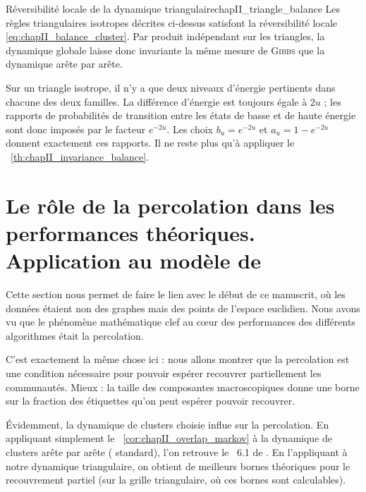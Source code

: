 \begin{Fait}{Réversibilité locale de la dynamique triangulaire}{chapII_triangle_balance}
Les règles triangulaires isotropes décrites ci-dessus satisfont la réversibilité locale \eqref{eq:chapII_balance_cluster}. Par produit indépendant sur les triangles, la dynamique globale laisse donc invariante la même mesure de \textsc{Gibbs} que la dynamique arête par arête.
\end{Fait}

\begin{Preuve}
Sur un triangle isotrope, il n'y a que deux niveaux d'énergie pertinents dans chacune des deux familles. La différence d'énergie est toujours égale à $2u$ ; les rapports de probabilités de transition entre les états de basse et de haute énergie sont donc imposés par le facteur $e^{-2u}$. Les choix $b_u=e^{-2u}$ et $a_u=1-e^{-2u}$ donnent exactement ces rapports. Il ne reste plus qu'à appliquer le \Th~\ref{th:chapII_invariance_balance}.
\end{Preuve}




\section{Le rôle de la percolation dans les performances théoriques. Application au modèle de \SB{}}

\label{sec:chapII_partie_applications}

Cette section nous permet de faire le lien avec le début de ce manuscrit, où les données étaient non des graphes mais des points de l'espace euclidien.
Nous avons vu que le phénomène mathématique clef au cœur des performances des différents algorithmes était la percolation.

C'est exactement la même chose ici : nous allons montrer que la percolation est une condition nécessaire pour pouvoir espérer recouvrer partiellement les communautés.
Mieux : la taille des composantes macroscopiques donne une borne sur la fraction des étiquettes qu'on peut espérer pouvoir recouvrer.

Évidemment, la dynamique de clusters choisie influe sur la percolation.
En appliquant simplement le \Cor~\ref{cor:chapII_overlap_markov} à la dynamique de clusters arête par arête (\SW{} standard), l'on retrouve le \Th~6.1 de \SB{} \cite{SankararamanBaccelli2018}. En l'appliquant à notre dynamique triangulaire, on obtient de meilleurs bornes théoriques pour le recouvrement partiel (sur la grille triangulaire, où ces bornes sont calculables).

